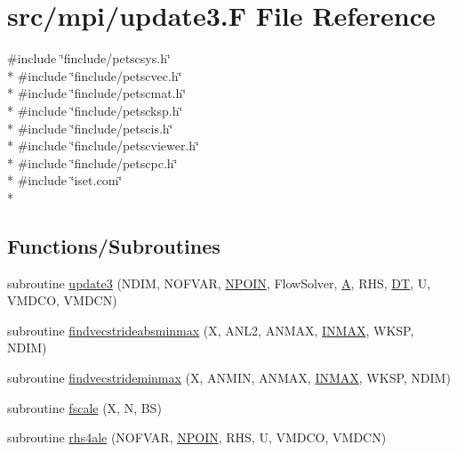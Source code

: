 \hypertarget{mpi_2update3_8_f}{\section{src/mpi/update3.F File Reference}
\label{mpi_2update3_8_f}
}
{\ttfamily \#include \char`\"{}finclude/petscsys.\-h\char`\"{}}\\*
{\ttfamily \#include \char`\"{}finclude/petscvec.\-h\char`\"{}}\\*
{\ttfamily \#include \char`\"{}finclude/petscmat.\-h\char`\"{}}\\*
{\ttfamily \#include \char`\"{}finclude/petscksp.\-h\char`\"{}}\\*
{\ttfamily \#include \char`\"{}finclude/petscis.\-h\char`\"{}}\\*
{\ttfamily \#include \char`\"{}finclude/petscviewer.\-h\char`\"{}}\\*
{\ttfamily \#include \char`\"{}finclude/petscpc.\-h\char`\"{}}\\*
{\ttfamily \#include \char`\"{}iset.\-com\char`\"{}}\\*
\subsection*{Functions/\-Subroutines}
\begin{DoxyCompactItemize}
\item 
subroutine \hyperlink{mpi_2update3_8_f_a1fa95004e6fe4f929e617b058b45c302}{update3} (N\-D\-I\-M, N\-O\-F\-V\-A\-R, \hyperlink{mesh_8com_ae28c1572321efcd8715b974d87d20c58}{N\-P\-O\-I\-N}, Flow\-Solver, \hyperlink{ibc2_8com_ad2108d58343608772fff791c23da58f5}{A}, R\-H\-S, \hyperlink{myts_8com_a41549d5ede5e2b840495daf35608da41}{D\-T}, U, V\-M\-D\-C\-O, V\-M\-D\-C\-N)
\item 
subroutine \hyperlink{mpi_2update3_8_f_a77d03590b7a1098381b9debf2d2c705b}{findvecstrideabsminmax} (X, A\-N\-L2, A\-N\-M\-A\-X, \hyperlink{conv_8com_a281aba02624028804313692bfd933597}{I\-N\-M\-A\-X}, W\-K\-S\-P, N\-D\-I\-M)
\item 
subroutine \hyperlink{mpi_2update3_8_f_a440340b0ed62b09e6285c68d04e8af50}{findvecstrideminmax} (X, A\-N\-M\-I\-N, A\-N\-M\-A\-X, \hyperlink{conv_8com_a281aba02624028804313692bfd933597}{I\-N\-M\-A\-X}, W\-K\-S\-P, N\-D\-I\-M)
\item 
subroutine \hyperlink{mpi_2update3_8_f_aa02299ce918cf0f3224e8a1c680bb75e}{fscale} (X, N, B\-S)
\item 
subroutine \hyperlink{mpi_2update3_8_f_a0de155f40ac3253e57fe27541644d7a3}{rhs4ale} (N\-O\-F\-V\-A\-R, \hyperlink{mesh_8com_ae28c1572321efcd8715b974d87d20c58}{N\-P\-O\-I\-N}, R\-H\-S, U, V\-M\-D\-C\-O, V\-M\-D\-C\-N)
\end{DoxyCompactItemize}


